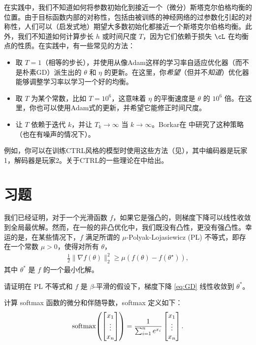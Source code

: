 \documentclass[../../book-main_zh.tex]{subfiles}
\begin{document}
在实践中，我们不知道如何将参数初始化到接近一个（微分）斯塔克尔伯格均衡的位置。由于目标函数内部的对称性，包括由被训练的神经网络的过参数化引起的对称性，人们可以（启发式地）期望大多数初始化都接近一个斯塔克尔伯格均衡。此外，我们不知道如何计算步长 \(h\) 或时间尺度 \(T\)，因为它们依赖于损失 \(\cL\) 在均衡点的性质。在实践中，有一些常见的方法：
\begin{itemize}
    \item 取 \(T = 1\)（相等的步长），并使用从像Adam这样的学习率自适应优化器（而不是朴素GD）派生出的 \(\theta\) 和 \(\eta\) 的更新。在这里，你\textit{希望}（但并不\textit{知道}）优化器能够调整学习率以学习一个好的均衡。
    \item 取 \(T\) 为某个常数，比如 \(T = 10^{6}\)，这意味着 \(\eta\) 的平衡速度是 \(\theta\) 的 \(10^{6}\) 倍。在这里，你也可以使用Adam式的更新，并希望它能修正时间尺度。
    \item 让 \(T\) 依赖于迭代 \(k\)，并让 \(T_{k} \to \infty\) 当 \(k \to \infty\)。Borkar在 \cite{borkar1997stochastic} 中研究了这种策略（也在有噪声的情况下）。
\end{itemize}
例如，你可以在训练CTRL风格的模型时使用这些方法（见），其中编码器是玩家1，解码器是玩家2。关于CTRL的一些理论在中给出。


\section{习题}

\begin{exercise}
    我们已经证明，对于一个光滑函数 $f$，如果它是强凸的，则梯度下降可以线性收敛到全局最优解。然而，在一般的非凸优化中，我们既没有凸性，更没有强凸性。幸运的是，在某些情况下，$f$ 满足所谓的 $\mu$-Polyak-Lojasiewicz (PL) 不等式，即存在一个常数 $\mu > 0$，使得对所有 $\theta$，
    \begin{align*}
        \frac{1}{2}\|\nabla f(\theta)\|_2^2 \ge \mu\left( f(\theta) - f(\theta^\star) \right),
    \end{align*}
    其中 $\theta^*$ 是 $f$ 的一个最小化解。  
    
    请证明在 PL 不等式和 $f$ 是 $\beta$-平滑的假设下，梯度下降 \eqref{eq:GD} 线性收敛到 $\theta^*$。 
\end{exercise}

\begin{exercise}
    计算 softmax 函数的微分和伴随导数，softmax 定义如下：
    \begin{equation}
        \softmax\rp{\mat{x_{1} \\ \vdots \\ x_{n}}} = \frac{1}{\sum_{i = 1}^{n}e^{x_{i}}}\mat{x_{1} \\ \vdots \\ x_{n}}.
    \end{equation}
\end{exercise}
\end{document}
